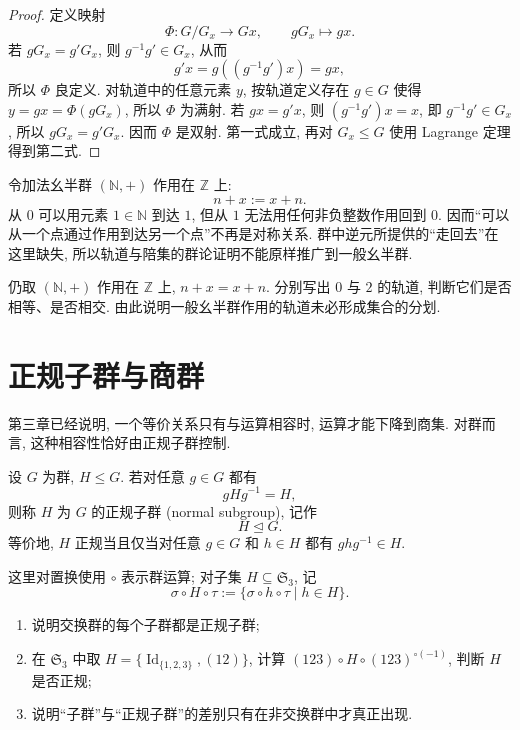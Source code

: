 \documentclass[usesamecnt, thmcnt=section, lang=cn, newtx, 10pt, scheme=chinese]{elegantbook}
\begin{document}
\begin{proof}
定义映射
\[
 \Phi:G/G_x\longrightarrow G x,
 \qquad
 gG_x\longmapsto g x.
\]
若 $gG_x=g'G_x$, 则 $g^{-1}g'\in G_x$, 从而
\[
 g' x=g((g^{-1}g') x)=g x,
\]
所以 $\Phi$ 良定义. 对轨道中的任意元素 $y$, 按轨道定义存在 $g\in G$ 使得 $y=g x=\Phi(gG_x)$, 所以 $\Phi$ 为满射. 若 $g x=g' x$, 则 $(g^{-1}g') x=x$, 即 $g^{-1}g'\in G_x$, 所以 $gG_x=g'G_x$. 因而 $\Phi$ 是双射. 第一式成立, 再对 $G_x\leq G$ 使用 Lagrange 定理得到第二式.
\end{proof}

\begin{instance}
令加法幺半群 $(\mathbb N,+)$ 作用在 $\mathbb Z$ 上:
\[
 n+x:=x+n.
\]
从 $0$ 可以用元素 $1\in\mathbb N$ 到达 $1$, 但从 $1$ 无法用任何非负整数作用回到 $0$. 因而``可以从一个点通过作用到达另一个点''不再是对称关系. 群中逆元所提供的``走回去''在这里缺失, 所以轨道与陪集的群论证明不能原样推广到一般幺半群.
\end{instance}

\begin{exercise}\label{ex:alg-orbit-group}
仍取 $(\mathbb N,+)$ 作用在 $\mathbb Z$ 上, $n+x=x+n$. 分别写出 $0$ 与 $2$ 的轨道, 判断它们是否相等、是否相交. 由此说明一般幺半群作用的轨道未必形成集合的分划.
\end{exercise}

\section{正规子群与商群}

第三章已经说明, 一个等价关系只有与运算相容时, 运算才能下降到商集. 对群而言, 这种相容性恰好由正规子群控制.

\begin{definition}[正规子群]\label{def:alg-normal-subgroup}
设 $G$ 为群, $H\leq G$. 若对任意 $g\in G$ 都有
\[
 gHg^{-1}=H,
\]
则称 $H$ 为 $G$ 的{\color{blue}正规子群 (normal subgroup)}, 记作
\[
 H\trianglelefteq G.
\]
等价地, $H$ 正规当且仅当对任意 $g\in G$ 和 $h\in H$ 都有 $ghg^{-1}\in H$.
\end{definition}

\begin{concept}\label{con:alg-normal-01}
这里对置换使用 $\circ$ 表示群运算; 对子集 $H\subseteq\mathfrak S_3$, 记
\[
 \sigma\circ H\circ\tau
 :=\{\sigma\circ h\circ\tau\mid h\in H\}.
\]
\begin{enumerate}[label=\rm(\arabic*)]
  \item 说明交换群的每个子群都是正规子群;
  \item 在 $\mathfrak S_3$ 中取 $H=\{\operatorname{Id}_{\{1,2,3\}},(12)\}$, 计算 $(123)\circ H\circ(123)^{\circ(-1)}$, 判断 $H$ 是否正规;
  \item 说明``子群''与``正规子群''的差别只有在非交换群中才真正出现.
\end{enumerate}
\end{concept}
\end{document}
